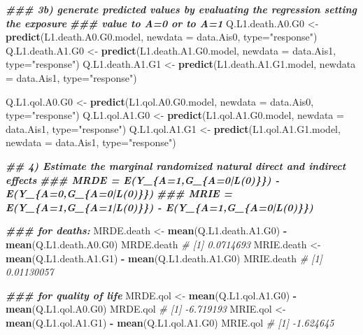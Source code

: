 \documentclass[
]{book}
\newenvironment{Shaded}{\begin{snugshade}}{\end{snugshade}}
\newcommand{\AttributeTok}[1]{\textcolor[rgb]{0.13,0.29,0.53}{#1}}
\newcommand{\CommentTok}[1]{\textcolor[rgb]{0.56,0.35,0.01}{\textit{#1}}}
\newcommand{\DocumentationTok}[1]{\textcolor[rgb]{0.56,0.35,0.01}{\textbf{\textit{#1}}}}
\newcommand{\FunctionTok}[1]{\textcolor[rgb]{0.13,0.29,0.53}{\textbf{#1}}}
\newcommand{\NormalTok}[1]{#1}
\newcommand{\OtherTok}[1]{\textcolor[rgb]{0.56,0.35,0.01}{#1}}
\newcommand{\SpecialCharTok}[1]{\textcolor[rgb]{0.81,0.36,0.00}{\textbf{#1}}}
\newcommand{\StringTok}[1]{\textcolor[rgb]{0.31,0.60,0.02}{#1}}
\begin{document}
\begin{Shaded}
\begin{Highlighting}[]
\DocumentationTok{\#\#\# 3b) generate predicted values by evaluating the regression setting the exposure}
\DocumentationTok{\#\#\#     value to A=0 or to A=1}
\NormalTok{Q.L1.death.A0.G0 }\OtherTok{\textless{}{-}} \FunctionTok{predict}\NormalTok{(L1.death.A0.G0.model, }\AttributeTok{newdata =}\NormalTok{ data.Ais0, }\AttributeTok{type=}\StringTok{"response"}\NormalTok{)}
\NormalTok{Q.L1.death.A1.G0 }\OtherTok{\textless{}{-}} \FunctionTok{predict}\NormalTok{(L1.death.A1.G0.model, }\AttributeTok{newdata =}\NormalTok{ data.Ais1, }\AttributeTok{type=}\StringTok{"response"}\NormalTok{)}
\NormalTok{Q.L1.death.A1.G1 }\OtherTok{\textless{}{-}} \FunctionTok{predict}\NormalTok{(L1.death.A1.G1.model, }\AttributeTok{newdata =}\NormalTok{ data.Ais1, }\AttributeTok{type=}\StringTok{"response"}\NormalTok{)}

\NormalTok{Q.L1.qol.A0.G0 }\OtherTok{\textless{}{-}} \FunctionTok{predict}\NormalTok{(L1.qol.A0.G0.model, }\AttributeTok{newdata =}\NormalTok{ data.Ais0, }\AttributeTok{type=}\StringTok{"response"}\NormalTok{)}
\NormalTok{Q.L1.qol.A1.G0 }\OtherTok{\textless{}{-}} \FunctionTok{predict}\NormalTok{(L1.qol.A1.G0.model, }\AttributeTok{newdata =}\NormalTok{ data.Ais1, }\AttributeTok{type=}\StringTok{"response"}\NormalTok{)}
\NormalTok{Q.L1.qol.A1.G1 }\OtherTok{\textless{}{-}} \FunctionTok{predict}\NormalTok{(L1.qol.A1.G1.model, }\AttributeTok{newdata =}\NormalTok{ data.Ais1, }\AttributeTok{type=}\StringTok{"response"}\NormalTok{)}

\DocumentationTok{\#\# 4) Estimate the marginal randomized natural direct and indirect effects}
\DocumentationTok{\#\#\# MRDE = E(Y\_\{A=1,G\_\{A=0|L(0)\}\}) {-} E(Y\_\{A=0,G\_\{A=0|L(0)\}\})}
\DocumentationTok{\#\#\# MRIE = E(Y\_\{A=1,G\_\{A=1|L(0)\}\}) {-} E(Y\_\{A=1,G\_\{A=0|L(0)\}\})}

\DocumentationTok{\#\#\# for deaths:}
\NormalTok{MRDE.death }\OtherTok{\textless{}{-}} \FunctionTok{mean}\NormalTok{(Q.L1.death.A1.G0) }\SpecialCharTok{{-}} \FunctionTok{mean}\NormalTok{(Q.L1.death.A0.G0)}
\NormalTok{MRDE.death}
\CommentTok{\# [1] 0.0714693}
\NormalTok{MRIE.death }\OtherTok{\textless{}{-}} \FunctionTok{mean}\NormalTok{(Q.L1.death.A1.G1) }\SpecialCharTok{{-}} \FunctionTok{mean}\NormalTok{(Q.L1.death.A1.G0)}
\NormalTok{MRIE.death}
\CommentTok{\# [1] 0.01130057}

\DocumentationTok{\#\#\# for quality of life}
\NormalTok{MRDE.qol }\OtherTok{\textless{}{-}} \FunctionTok{mean}\NormalTok{(Q.L1.qol.A1.G0) }\SpecialCharTok{{-}} \FunctionTok{mean}\NormalTok{(Q.L1.qol.A0.G0)}
\NormalTok{MRDE.qol}
\CommentTok{\# [1] {-}6.719193}
\NormalTok{MRIE.qol }\OtherTok{\textless{}{-}}  \FunctionTok{mean}\NormalTok{(Q.L1.qol.A1.G1) }\SpecialCharTok{{-}} \FunctionTok{mean}\NormalTok{(Q.L1.qol.A1.G0)}
\NormalTok{MRIE.qol}
\CommentTok{\# [1] {-}1.624645}
\end{Highlighting}
\end{Shaded}
\end{document}
